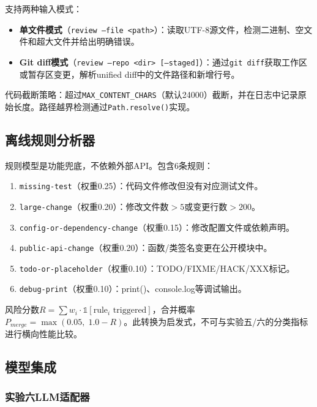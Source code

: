 \documentclass{experimentreport}
\begin{document}
支持两种输入模式：

\begin{itemize}
  \item \textbf{单文件模式}（\texttt{review --file <path>}）：读取UTF-8源文件，检测二进制、空文件和超大文件并给出明确错误。
  \item \textbf{Git diff模式}（\texttt{review --repo <dir> [--staged]}）：通过\texttt{git diff}获取工作区或暂存区变更，解析unified diff中的文件路径和新增行号。
\end{itemize}

代码截断策略：超过\texttt{MAX\_CONTENT\_CHARS}（默认24000）截断，并在日志中记录原始长度。路径越界检测通过\texttt{Path.resolve()}实现。

\subsection{离线规则分析器}

规则模型是功能兜底，不依赖外部API。包含6条规则：

\begin{enumerate}
  \item \texttt{missing-test}（权重0.25）：代码文件修改但没有对应测试文件。
  \item \texttt{large-change}（权重0.20）：修改文件数$>5$或变更行数$>200$。
  \item \texttt{config-or-dependency-change}（权重0.15）：修改配置文件或依赖声明。
  \item \texttt{public-api-change}（权重0.20）：函数/类签名变更在公开模块中。
  \item \texttt{todo-or-placeholder}（权重0.10）：TODO/FIXME/HACK/XXX标记。
  \item \texttt{debug-print}（权重0.10）：print()、console.log等调试输出。
\end{enumerate}

风险分数$R = \sum w_i \cdot \mathbb{1}[\text{rule}_i \text{ triggered}]$，合并概率$P_{merge} = \max(0.05,\; 1.0 - R)$。此转换为启发式，不可与实验五/六的分类指标进行横向性能比较。

\subsection{模型集成}

\subsubsection{实验六LLM适配器}
\end{document}

